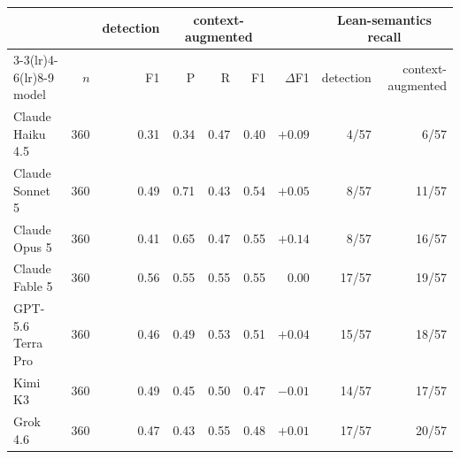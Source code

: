 \begin{tabular}{lrrrrrrrr}
\toprule
 & & detection & \multicolumn{3}{c}{context-augmented} & & \multicolumn{2}{c}{Lean-semantics recall} \\
\cmidrule(lr){3-3}\cmidrule(lr){4-6}\cmidrule(lr){8-9}
model & $n$ & F1 & P & R & F1 & $\Delta$F1 & detection & context-augmented \\
\midrule
    Claude Haiku 4.5 & 360 & 0.31 & 0.34 & 0.47 & 0.40 & $+0.09$ & 4/57 & 6/57 \\
    Claude Sonnet 5 & 360 & 0.49 & 0.71 & 0.43 & 0.54 & $+0.05$ & 8/57 & 11/57 \\
    Claude Opus 5 & 360 & 0.41 & 0.65 & 0.47 & 0.55 & $+0.14$ & 8/57 & 16/57 \\
    Claude Fable 5 & 360 & 0.56 & 0.55 & 0.55 & 0.55 & $0.00$ & 17/57 & 19/57 \\
    GPT-5.6 Terra Pro & 360 & 0.46 & 0.49 & 0.53 & 0.51 & $+0.04$ & 15/57 & 18/57 \\
    Kimi K3 & 360 & 0.49 & 0.45 & 0.50 & 0.47 & $-0.01$ & 14/57 & 17/57 \\
    Grok 4.6 & 360 & 0.47 & 0.43 & 0.55 & 0.48 & $+0.01$ & 17/57 & 20/57 \\
\bottomrule
\end{tabular}
